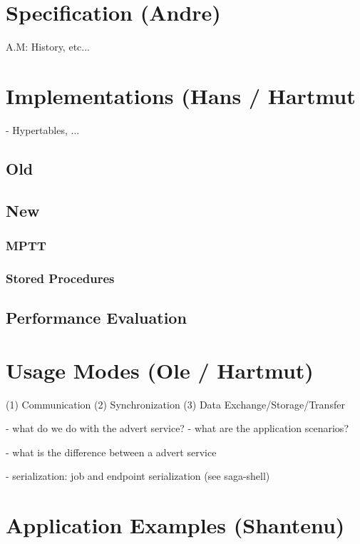 \documentclass[a4paper,10pt,twocolumn]{article}
\begin{document}
\section{Specification (Andre)}
A.M: History, etc... 

\section{Implementations (Hans / Hartmut} 

- Hypertables, ... 

\subsection{Old}

\subsection{New}

\subsubsection{MPTT}

\subsubsection{Stored Procedures}

\subsection{Performance Evaluation}

\section{Usage Modes (Ole / Hartmut)}

(1) Communication (2) Synchronization (3) Data Exchange/Storage/Transfer

- what do we do with the advert service? 
- what are the application scenarios? 

- what is the difference between a advert service 

- serialization: job and endpoint serialization (see saga-shell)

\section{Application Examples (Shantenu)}

\thispagestyle{plain}
\end{document}
